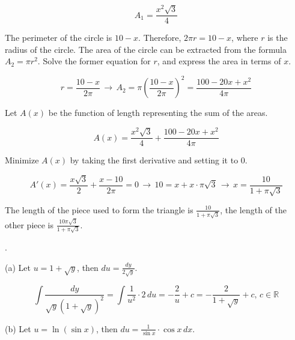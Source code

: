 \documentclass{article}
\begin{document}
\begin{equation*}
A_1 = \frac{x^2\sqrt3}{4}
\end{equation*}

\hfill

\noindent The perimeter of the circle is $10-x$. Therefore, $2\pi r = 10-x$, where $r$ is the radius of the circle. The area of the circle can be extracted from the formula $A_2=\pi r^2$. Solve the former equation for $r$, and express the area in terms of $x$.

\begin{equation*}
    r=\frac{10-x}{2\pi}\,\rightarrow\, A_2 = \pi\left(\frac{10-x}{2\pi}\right)^2 =\frac{100-20x+x^2}{4\pi}
\end{equation*}

\hfill

\noindent Let $A(x)$ be the function of length representing the sum of the areas.

\begin{equation*}
    A(x) = \frac{x^2\sqrt3}{4}+\frac{100-20x+x^2}{4\pi}
\end{equation*}

\hfill

\noindent Minimize $A(x)$ by taking the first derivative and setting it to $0$.

\begin{equation*}
A'(x)=\frac{x\sqrt3}{2} + \frac{x-10}{2\pi}=0\,\rightarrow\,10=x+x\cdot\pi\sqrt3\,\rightarrow\,x=\frac{10}{1+\pi\sqrt3}
\end{equation*}

\hfill

\noindent The length of the piece used to form the triangle is $\displaystyle\frac{10}{1+\pi\sqrt3}$, the length of the other piece is $\displaystyle\frac{10\pi\sqrt3}{1+\pi\sqrt3}$.

\hfill

.

\hfill

\noindent (a) Let $u=1+\sqrt y$, then $\displaystyle du=\frac{dy}{2\sqrt y}$.

\begin{equation*}
\int\frac{dy}{\sqrt{y}\left(1+\sqrt y\right)^2}=\int\frac{1}{u^2}\cdot2\,du=-\frac{2}{u}+c=\boxed{-\frac{2}{1+\sqrt y}+c,\,c\in\mathbb{R}}
\end{equation*}

\hfill

\noindent (b) Let $u=\ln(\sin x)$, then $\displaystyle du=\frac{1}{\sin x}\cdot \cos x\,dx$.
\end{document}
